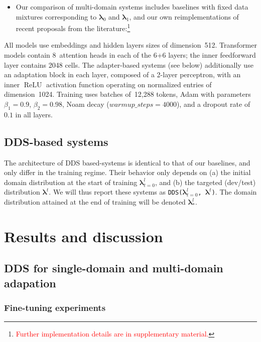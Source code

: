 \documentclass[11pt,a4paper]{article}
\newcommand{\fyTodo}[1]{\Todo[FY:]{\textcolor{orange}{#1}}}
\newcommand{\revision}[1]{\textcolor{red}{#1}}
\newcommand{\system}[1]{\texttt{{#1}}}
\newcommand{\vlambda}{\ensuremath{\boldsymbol\lambda}\xspace} %
\begin{document}
\begin{itemize}
\item Our comparison of multi-domain systems includes baselines with fixed data mixtures corresponding to $\vlambda_0$ and $\vlambda_1$, and our own reimplementations of recent proposals from the literature:\footnote{\revision{Further implementation details are in supplementary material.}}\fyTodo{Choose a reasonnable MD baseline }

\end{itemize}

All models use embeddings and hidden layers sizes of dimension~512. Transformer models contain 8~attention heads in each of the 6+6 layers; the inner feedforward layer contains 2048 cells. The adapter-based systems (see below) additionally use an adaptation block in each layer, composed of a 2-layer perceptron, with an inner $\operatorname{ReLU}$ activation function operating on normalized entries of dimension~1024. 
Training uses batches of~12,288 tokens, Adam with parameters $\beta_1=0.9$, $\beta_2= 0.98$, Noam decay ($warmup\_steps=4000$), and a dropout rate of $0.1$ in all layers.

\subsection{DDS-based systems } \label{ssec:dds-sys}

The architecture of DDS based-systems is identical to that of our baselines, and only differ in the training regime. Their behavior only depends on (a) the initial domain distribution at the start of training $\vlambda^{l}_{t=0}$, and (b) the targeted (dev/test) distribution $\vlambda^{t}$. We will thus report these systems as \system{DDS($\vlambda^{l}_{t=0}$, $\vlambda^{t}$)}. The domain distribution attained at the end of training will be denoted  $\vlambda^{l}_{*}$.

\section{Results and discussion \label{sec:results}}

\subsection{DDS for single-domain and multi-domain adapation}

\subsubsection{Fine-tuning experiments}
\end{document}

